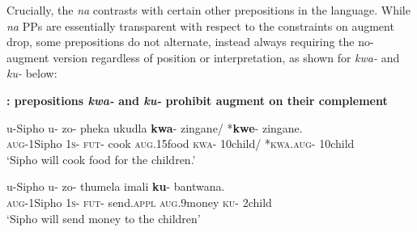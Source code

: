 \documentclass[output=paper,
modfonts
]{langscibook}
\begin{document}
Crucially, the {\it na}  contrasts with certain other prepositions in the language.  While  {\it na} PPs are essentially transparent with respect to the constraints on
augment drop, some prepositions do not alternate, instead always requiring the no-augment version regardless of position or interpretation, as shown 
for  {\it kwa-} and {\it ku-}  below:



\begin{exe}

\ex\label{P1}\textbf{: prepositions {\it kwa-} and {\it ku-} prohibit augment on their complement}\begin{xlist}

%
%



\ex\gll u-Sipho u- zo- pheka ukudla \textbf{kwa}- zingane/ *\textbf{kwe}- zingane.\\
\textsc{aug}-1Sipho 1\textsc{s}- \textsc{fut}- cook \textsc{aug}.15food \textsc{kwa}- 10child/ *\textsc{kwa}.\textsc{aug}- 10child\\
\glt `Sipho will cook food for the children.'


\ex\gll  u-Sipho u- zo- thumela imali \textbf{ku}- bantwana.\\
\textsc{aug}-1Sipho 1\textsc{s}- \textsc{fut}- send.{\textsc{appl}} \textsc{aug}.9money \textsc{ku}- 2child\\
\glt `Sipho will send money to the children'

%
%
%
%


\end{xlist}
\end{exe}
\end{document}
